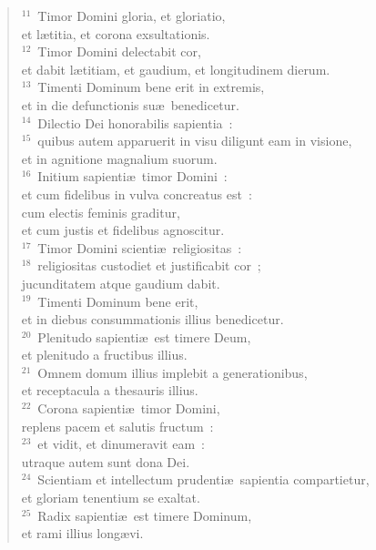 \begin{verse}${}^{11}$~Timor Domini gloria, et gloriatio,\\ et l\ae titia, et corona exsultationis.\\
${}^{12}$~Timor Domini delectabit cor,\\ et dabit l\ae titiam, et gaudium, et longitudinem dierum.\\
${}^{13}$~Timenti Dominum bene erit in extremis,\\ et in die defunctionis su\ae\ benedicetur.\\
${}^{14}$~Dilectio Dei honorabilis sapientia~:\\
${}^{15}$~quibus autem apparuerit in visu diligunt eam in visione,\\ et in agnitione magnalium suorum.\\
${}^{16}$~Initium sapienti\ae\ timor Domini~:\\ et cum fidelibus in vulva concreatus est~:\\ cum electis feminis graditur,\\ et cum justis et fidelibus agnoscitur.\\
${}^{17}$~Timor Domini scienti\ae\ religiositas~:\\
${}^{18}$~religiositas custodiet et justificabit cor~;\\ jucunditatem atque gaudium dabit.\\
${}^{19}$~Timenti Dominum bene erit,\\ et in diebus consummationis illius benedicetur.\\
${}^{20}$~Plenitudo sapienti\ae\ est timere Deum,\\ et plenitudo a fructibus illius.\\
${}^{21}$~Omnem domum illius implebit a generationibus,\\ et receptacula a thesauris illius.\\
${}^{22}$~Corona sapienti\ae\ timor Domini,\\ replens pacem et salutis fructum~:\\
${}^{23}$~et vidit, et dinumeravit eam~:\\ utraque autem sunt dona Dei.\\
${}^{24}$~Scientiam et intellectum prudenti\ae\ sapientia compartietur,\\ et gloriam tenentium se exaltat.\\
${}^{25}$~Radix sapienti\ae\ est timere Dominum,\\ et rami illius long\ae vi.\\

\end{verse}
